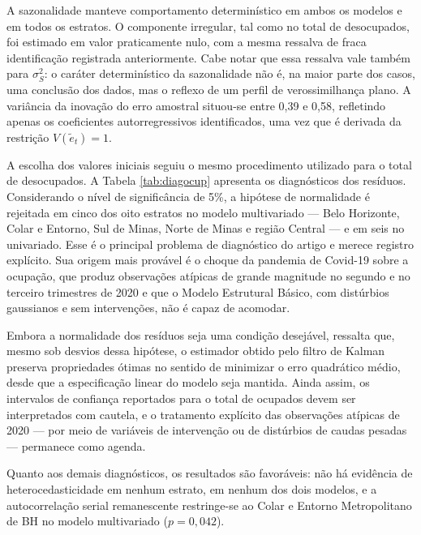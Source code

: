 \documentclass[rbe,wwwview]{econbr}
\begin{document}
A sazonalidade manteve comportamento determinístico em ambos os modelos e em todos os estratos. O componente irregular, tal como no total de desocupados, foi estimado em valor praticamente nulo, com a mesma ressalva de fraca identificação registrada anteriormente. Cabe notar que essa ressalva vale também para \(\sigma_S^2\): o caráter determinístico da sazonalidade não é, na maior parte dos casos, uma conclusão dos dados, mas o reflexo de um perfil de verossimilhança plano. A variância da inovação do erro amostral situou-se entre 0,39 e 0,58, refletindo apenas os coeficientes autorregressivos identificados, uma vez que é derivada da restrição \(V(\tilde{e}_t)=1\).

\vspace{-0.3cm}

\vspace{-0.4cm}

A escolha dos valores iniciais seguiu o mesmo procedimento utilizado para o total de desocupados. A Tabela \ref{tab:diagocup} apresenta os diagnósticos dos resíduos. Considerando o nível de significância de 5\%, a hipótese de normalidade é rejeitada em cinco dos oito estratos no modelo multivariado --- Belo Horizonte, Colar e Entorno, Sul de Minas, Norte de Minas e região Central --- e em seis no univariado. Esse é o principal problema de diagnóstico do artigo e merece registro explícito. Sua origem mais provável é o choque da pandemia de Covid-19 sobre a ocupação, que produz observações atípicas de grande magnitude no segundo e no terceiro trimestres de 2020 e que o Modelo Estrutural Básico, com distúrbios gaussianos e sem intervenções, não é capaz de acomodar.

Embora a normalidade dos resíduos seja uma condição desejável, \citet{harvey1989} ressalta que, mesmo sob desvios dessa hipótese, o estimador obtido pelo filtro de Kalman preserva propriedades ótimas no sentido de minimizar o erro quadrático médio, desde que a especificação linear do modelo seja mantida. Ainda assim, os intervalos de confiança reportados para o total de ocupados devem ser interpretados com cautela, e o tratamento explícito das observações atípicas de 2020 --- por meio de variáveis de intervenção ou de distúrbios de caudas pesadas --- permanece como agenda.

Quanto aos demais diagnósticos, os resultados são favoráveis: não há evidência de heterocedasticidade em nenhum estrato, em nenhum dos dois modelos, e a autocorrelação serial remanescente restringe-se ao Colar e Entorno Metropolitano de BH no modelo multivariado (\(p=0{,}042\)).
\end{document}
